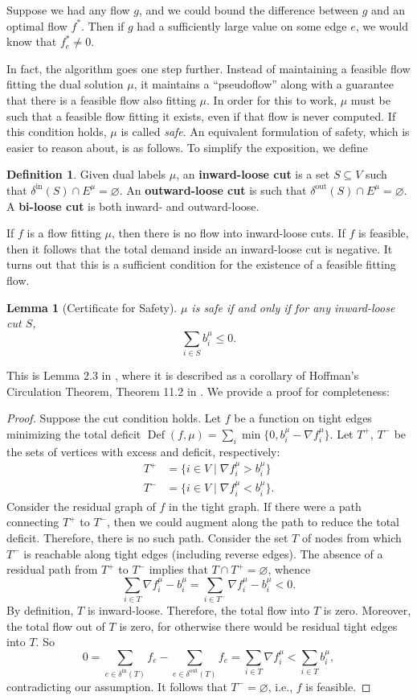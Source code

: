 \documentclass[11pt]{article}
\newtheorem{lemma}[theorem]{Lemma}
\theoremstyle{definition}
\newtheorem{definition}{Definition}[section]
\theoremstyle{definition}
\newcommand{\fu}{f^{\mu}}
\newcommand{\nfiu}{\nabla \fu_i}
\newcommand{\biu}{b_{i}^{\mu}}
\newcommand{\din}{\delta^{\text{in}}}
\newcommand{\dout}{\delta^{\text{out}}}
\DeclareMathOperator{\Def}{Def}
\begin{document}
	Suppose we had any flow $g$, and we could bound the difference between $g$ and an optimal
	flow $f^*$. Then if $g$ had a sufficiently large value on some edge $e$, we would know that
	$f^*_e \neq 0$.
	
	In fact, the algorithm goes one step further. Instead of maintaining a feasible flow
	fitting the dual solution $\mu$, it maintains a ``pseudoflow'' along with a guarantee
	that there is a feasible flow also fitting $\mu$. In order for this to work, $\mu$
	must be such that a feasible flow fitting it exists, even if that flow is never
	computed. If this condition holds, $\mu$ is called \emph{safe}. An equivalent
	formulation of safety, which is easier to reason about, is as follows. To simplify
	the exposition, we define 
	\begin{definition}
		Given dual labels $\mu$, an \textbf{inward-loose cut} is a set $S \subseteq V$ such that
		$\din(S) \cap E^\mu = \varnothing$. An \textbf{outward-loose cut}
		is such that $\dout(S) \cap E^\mu = \varnothing$. A \textbf{bi-loose cut}
		is both inward- and outward-loose.
	\end{definition}
	If $f$ is a flow fitting $\mu$, then there is no flow into inward-loose cuts.
	If $f$ is feasible, then it follows that the total demand inside an inward-loose
	cut is negative. It turns out that this is a sufficient condition for the existence
	of a feasible fitting flow.
	\begin{lemma}[Certificate for Safety]
	$\mu$ is safe if and only if for any inward-loose cut $S$,
	\[ \sum_{i \in S} \biu \leq 0. \]
	\end{lemma}
	This is Lemma 2.3 in \cite{Olver2017}, where it is described as a corollary of Hoffman's Circulation
	Theorem, Theorem 11.2 in \cite{Schrijver2002}. We provide a proof for completeness:
	\begin{proof}
		Suppose the cut condition holds. Let $f$ be a function on tight edges minimizing
		the total deficit $\Def(f, \mu) = \sum_i \min\{0, \biu - \nfiu\}$. Let
		$T^+$, $T^-$ be the sets of vertices with excess and deficit, respectively:
		\begin{align*}
			T^+ &= \{i \in V \mid \nfiu > \biu \} \\
			T^- &= \{i \in V \mid \nfiu < \biu \}.
		\end{align*}
		Consider the residual graph of $f$ in the tight graph. If there were a path
		connecting $T^+$ to $T^-$, then we could augment along the path
		to reduce the total deficit. Therefore, there is no such path. Consider the
		set $T$ of nodes from which $T^-$ is reachable along tight edges (including reverse edges).
		The absence of a residual path from $T^+$ to $T^-$
        implies that $T \cap T^+ = \varnothing$, whence
		\[ \sum_{i \in T} \nfiu - \biu = \sum_{i \in T^-} \nfiu - \biu < 0. \]
		By definition, $T$ is inward-loose. Therefore, the total flow into $T$ is zero.
        Moreover, the total flow out of $T$ is zero, for otherwise there would be
        residual tight edges into $T$. So
		\[ 0 = \sum_{e \in \din(T)} f_e - \sum_{e \in \dout(T)} f_e
		     = \sum_{i \in T} \nfiu < \sum_{i \in T} \biu, \]
		contradicting our assumption. It follows that $T^- = \varnothing$, i.e., $f$
		is feasible.
	\end{proof}
\end{document}
